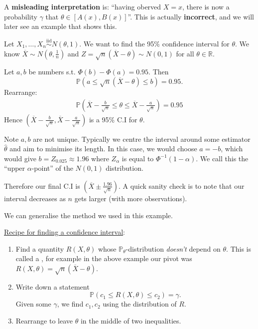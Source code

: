 \documentclass[a4paper]{scrartcl}
\begin{document}
A \textbf{misleading interpretation} is: ``having oberved $X=x$, there is now a probability $\gamma$ that $\theta \in [A (x),B (x)]$''. This is actually \textbf{incorrect}, and we will later see an example that shows this.
\begin{example*}
      Let $X_1 , \ldots, X_n \overset{\operatorname{iid}}{\sim} N (\theta,1)$. We want to find the 95\% confidence interval for $\theta$. We know $\overline{X} \sim N (\theta, \frac{1}{n})$ and $Z=\sqrt{n}(\overline{X}-\theta)\sim N (0,1)$ for all $\theta \in \mathbb{R}$. 

      Let $a,b$ be numbers s.t. $\Phi (b)-\Phi (a)=0.95$. Then \[
      \mathbb{P}(a \leq \sqrt{n}(\overline{X}-\theta)\leq b)=0.95
      .\] Rearrange: 
      \begin{align*}
           \mathbb{P}(\overline{X}-\frac{b}{\sqrt{n}}\leq \theta \leq \overline{X}-\frac{a}{\sqrt{n}})=0.95
      \end{align*}
      Hence $(\overline{X}-\frac{b}{\sqrt{n}},\overline{X}-\frac{a}{\sqrt{n}})$ is a 95\% C.I for $\theta$. 
      
      Note $a,b$ are not unique. Typically we centre the interval around some estimator $\hat{\theta}$ and aim to minimise its length. In this case, we would choose $a=-b$, which would give $b=Z_{0.025}\approx 1.96$ where $Z_{\alpha}$ is equal to ${\Phi}^{-1}(1-\alpha)$. We call this the ``upper $\alpha$-point'' of the $N (0,1)$ distribution.

      Therefore our final C.I is $(\overline{X}\pm \frac{1.96}{\sqrt{n}})$. A quick sanity check is to note that our interval decreases as $n$ gets larger (with more observations).
\end{example*}
We can generalise the method we used in this example.
\begin{remark}
      \underline{Recipe for finding a confidence interval}:
      \begin{enumerate}
           \item Find a quantity $R (X, \theta)$ whose $\mathbb{P}_{\theta}$-distribution \emph{doesn't} depend on $\theta$. This is called a , for example in the above example our pivot was $R (X , \theta)=\sqrt{n}(\overline{X}-\theta)$.
           \item Write down a statement \[
           \mathbb{P} (c_1 \leq R (X,\theta) \leq c_2 )=\gamma
           .\] Given some $\gamma$, we find $c_1 ,c_2 $ using the distribution of $R$.
           \item Rearrange to leave $\theta$ in the middle of two inequalities.
      \end{enumerate}
\end{remark}
\end{document}
